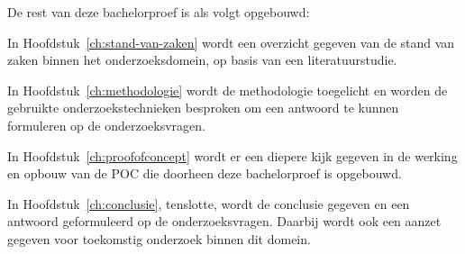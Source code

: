 De rest van deze bachelorproef is als volgt opgebouwd:

In Hoofdstuk~\ref{ch:stand-van-zaken} wordt een overzicht gegeven van de stand van zaken binnen het onderzoeksdomein, op basis van een literatuurstudie.

In Hoofdstuk~\ref{ch:methodologie} wordt de methodologie toegelicht en worden de gebruikte onderzoekstechnieken besproken om een antwoord te kunnen formuleren op de onderzoeksvragen.

In Hoofdstuk~\ref{ch:proofofconcept} wordt er een diepere kijk gegeven in de werking en opbouw van de POC die doorheen deze bachelorproef is opgebouwd.

In Hoofdstuk~\ref{ch:conclusie}, tenslotte, wordt de conclusie gegeven en een antwoord geformuleerd op de onderzoeksvragen. Daarbij wordt ook een aanzet gegeven voor toekomstig onderzoek binnen dit domein.
